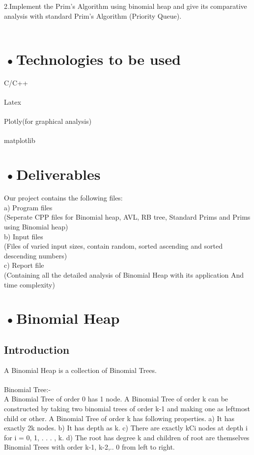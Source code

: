 \documentclass[10pt,a4paper]{article}
\begin{document}
	2.Implement the Prim’s Algorithm using binomial heap and give its comparative analysis with standard Prim’s Algorithm (Priority Queue).\\ \\ 
	
\section*{•Technologies to be used}

	C/C++\\
	\\Latex\\
	\\Plotly(for graphical analysis)\\
	\\matplotlib


\section*{•Deliverables}

Our project contains the following files:\\
a) Program files\\
	(Seperate CPP files for Binomial heap, AVL, RB tree, Standard Prims and Prims using Binomial heap)\\

b) Input files \\
	(Files of varied input sizes, contain random, sorted ascending and sorted descending  numbers)\\
	
c) Report file \\
	(Containing all the detailed analysis of Binomial Heap with its application And time complexity)

	

\section*{•Binomial Heap} 

\subsection*{Introduction}
	A Binomial Heap is a collection of Binomial Trees.\\ \\
Binomial Tree:- \\
A Binomial Tree of order 0 has 1 node. A Binomial Tree of order k can be constructed by taking two binomial trees of order k-1 and making one as leftmost child or other.
A Binomial Tree of order k has following properties.
a) It has exactly 2k nodes.
b) It has depth as k.
c) There are exactly kCi nodes at depth i for i = 0, 1, . . . , k.
d) The root has degree k and children of root are themselves Binomial Trees with order k-1, k-2,.. 0 from left to right.\\ 
\end{document}
